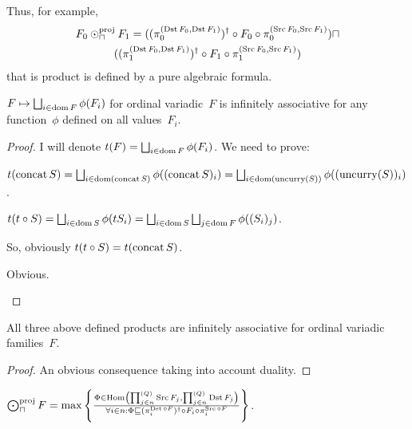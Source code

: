 \begin{rem}
  Thus, for example,
\begin{multline*}
  F_0 \odot^{\text{proj}}_{\sqcap} F_1 = ((\pi^{(\operatorname{Dst} F_0 , \operatorname{Dst}
  F_1)}_0)^{\dagger} \circ F_0 \circ \pi^{(\operatorname{Src} F_0 , \operatorname{Src}
  F_1)}_0) \sqcap\\ ((\pi^{(\operatorname{Dst} F_0 , \operatorname{Dst} F_1)}_1)^{\dagger}
  \circ F_1 \circ \pi^{(\operatorname{Src} F_0 , \operatorname{Src} F_1)}_1)
\end{multline*}
  that is product is defined by a pure algebraic formula.
\end{rem}

\begin{lem}
$F\mapsto\bigsqcup_{i\in\dom F}\phi(F_i)$ for ordinal variadic~$F$ is infinitely
associative for any function~$\phi$ defined on all values~$F_i$.
\end{lem}

\begin{proof}
I will denote $t(F)=\bigsqcup_{i\in\dom F}\phi(F_i)$. We need
to prove:
\begin{widedisorder}
\item[$t(t\circ S)=t(\concat S)$]
$t(\concat S)=
\bigsqcup_{i\in\dom(\concat S)}\phi((\concat S)_i)=
\bigsqcup_{i\in\dom(\uncurry(S))}\phi((\uncurry(S))_i)$.

$t(t\circ S)=
\bigsqcup_{i\in\dom S}\phi(tS_i)=
\bigsqcup_{i\in\dom S}\bigsqcup_{j\in\dom F}\phi((S_i)_j)$.

So, obviously $t(t\circ S)=t(\concat S)$.

\item[$t(\llbracket x\rrbracket)=x$] Obvious.
\end{widedisorder}
\end{proof}

\begin{cor}
All three above defined products are infinitely associative
for ordinal variadic families~$F$.
\end{cor}

\begin{proof}
An obvious consequence taking into account duality.
\end{proof}

\begin{prop}
  $\bigodot^{\text{proj}}_{\sqcap} F = \max \left\{ \frac{ \Phi \in \operatorname{Hom} \left( \prod^{(Q)}_{j \in
  n} \operatorname{Src} F_j , \prod^{(Q)}_{j \in n} \operatorname{Dst} F_j \right)
  }{ \forall i \in n : \Phi \sqsubseteq (\pi^{\operatorname{Dst}\circ F}_i)^{\dagger} \circ F_i \circ \pi^{\operatorname{Src}\circ F}_i }\right\}$.
\end{prop}

